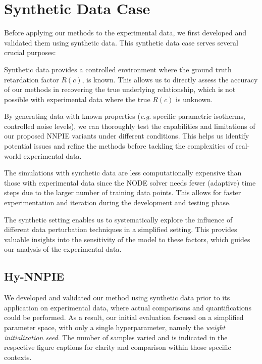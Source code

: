 \section{Synthetic Data Case}
Before applying our methods to the experimental data, we first developed and validated them using synthetic data. This synthetic data case serves several crucial purposes:
\begin{enumerate*}
    \item Synthetic data provides a controlled environment where the ground truth retardation factor $R(c)$, is known. This allows us to directly assess the accuracy of our methods in recovering the true underlying relationship, which is not possible with experimental data where the true $R(c)$ is unknown.
    \item By generating data with known properties (\emph{e.g.} specific parametric isotherms, controlled noise levels), we can thoroughly test the capabilities and limitations of our proposed NNPIE variants under different conditions. This helps us identify potential issues and refine the methods before tackling the complexities of real-world experimental data.
    \item The simulations with synthetic data are less computationally expensive than those with experimental data since the NODE solver needs fewer (adaptive) time steps due to the larger number of training data points. This allows for faster experimentation and iteration during the development and testing phase.
    \item The synthetic setting enables us to systematically explore the influence of different data perturbation techniques in a simplified setting. This provides valuable insights into the sensitivity of the model to these factors, which guides our analysis of the experimental data.
\end{enumerate*}

\subsection{Hy-NNPIE}
We developed and validated our method using synthetic data prior to its application on experimental data, where actual comparisons and quantifications could be performed. As a result, our initial evaluation focused on a simplified parameter space, with only a single hyperparameter, namely the \textit{weight initialization seed}.
The number of samples varied and is indicated in the respective figure captions for clarity and comparison within those specific contexts.

